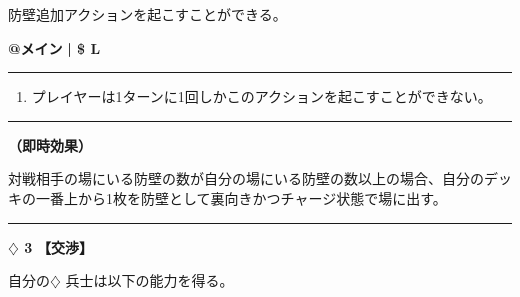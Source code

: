 \documentclass[twocolumn,a5paper,papersize,10pt]{jarticle}
\begin{document}
防壁追加アクションを起こすことができる。

\begin{tcolorbox}[title={\small\bf【Action】防壁追加}{\scriptsize （通常魔法）}]

{\scriptsize\bf @メイン }
  {\scriptsize\bf | \$ L }

\vspace{1mm} %
\hrule height 0.1mm depth 0mm width 62mm %
\vspace{1mm} %


\vspace{-1zh}%
\begin{enumerate}
\renewcommand{\labelenumi}{※}
\setlength{\leftskip}{-0.3cm}
\setlength{\itemsep}{0pt} %
\setlength{\parskip}{0pt} %

\item プレイヤーは1ターンに1回しかこのアクションを起こすことができない。

\vspace{-3mm}%
\end{enumerate}
\vspace{-2mm} %
\vspace{1zh}%
\vspace{1mm} %
\hrule height 0.1mm depth 0mm width 62mm %
\vspace{1mm} %

{\bf（即時効果）}

対戦相手の場にいる防壁の数が自分の場にいる防壁の数以上の場合、自分のデッキの一番上から1枚を防壁として裏向きかつチャージ状態で場に出す。

\vspace{1mm} %
\end{tcolorbox}

\vspace{-1zh}
  
 

\vspace{3mm} %
\hrule height 0.5mm depth 0mm width 66.5mm %
\vspace{1mm} %
{\Large\bf $\diamondsuit$ 3} {\normalsize\bf【交渉】} %
\vspace{1mm} %

自分の{\normalsize $\diamondsuit$} 兵士は以下の能力を得る。
\end{document}

